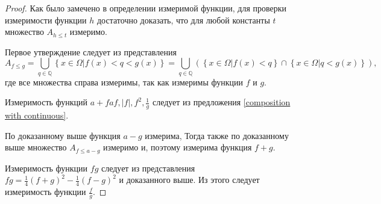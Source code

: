 \documentclass[12pt]{article}
\newtheorem{proposition}[theorem]{Предложение}
\numberwithin{theorem}{section}
\theoremstyle{definition}
\newcommand{\defineset}[2]{\left\{
	\left.
	#1
	\right\vert
	#2
	\right\}}
\begin{document}
	\begin{proof}
		Как было замечено в определении измеримой функции,
		для проверки измеримости функции $ h $ достаточно доказать, что 
		для любой константы $ t $ множество $ A_{h \leqslant t} $ измеримо. 
		
		Первое утверждение следует из представления
		$$ A_{f \leqslant g} = \bigcup\limits_{q \in \mathbb{Q}} \defineset{x \in \Omega}{f(x) < q < g(x)}
		= \bigcup\limits_{q \in \mathbb{Q}} \left(\defineset{x \in \Omega}{f(x) < q} 
		\cap \defineset{x \in \Omega}{q < g(x)} \right), $$
		где все множества справа измеримы, так как измеримы функции $ f $ и $ g $.
		
		Измеримость функций $ a + f af, |f|, f^2, \tfrac{1}{g} $ следует из предложения \ref{composition with continuous}.
		
		По доказанному выше функция $ a - g $ измерима, 
		Тогда также по доказанному выше множество $ A_{f \leqslant a - g} $ измеримо и, 
		поэтому измерима функция $ f + g $.
		
		Измеримость функции $ fg $ следует из представления $ fg = \tfrac{1}{4}(f + g)^2 - \tfrac{1}{4}(f - g)^2 $
		и доказанного выше. Из этого следует измеримость функции $ \tfrac{f}{g} $.
	\end{proof}
	
	
\end{document}
